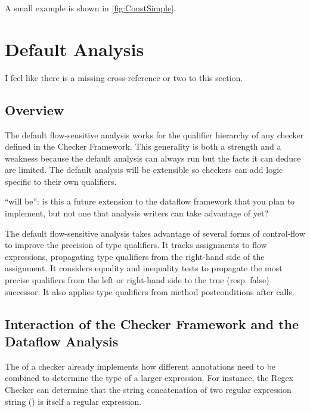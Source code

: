      A small example is shown in \autoref{fig:ConstSimple}.




\section{Default Analysis}

\begin{workinprogress}
I feel like there is a missing cross-reference or two to this section.
\end{workinprogress}

\subsection{Overview}

The default flow-sensitive analysis  works for the qualifier hierarchy of any checker defined in 
the Checker Framework.  This generality is both a strength and a weakness because the 
default analysis can
always run but the facts it can deduce are limited.  The default analysis
will be extensible so checkers can add logic specific to their own qualifiers.

\begin{workinprogress}
``will be'':  is this a future extension to the dataflow framework that you
plan to implement, but not one that analysis writers can take advantage of yet?
\end{workinprogress}

The default flow-sensitive analysis takes advantage of several forms of control-flow to improve the precision of type qualifiers.  It tracks assignments to flow expressions, propagating type qualifiers from the right-hand side of the assignment.  It considers equality and inequality tests to propagate the most precise qualifiers from the left or right-hand side to the true (resp. false) successor.  It also applies type qualifiers from method postconditions after calls.



\subsection{Interaction of the Checker Framework and the Dataflow Analysis}
\label{sec:flow-cf-interaction}

The  of a checker already implements how different annotations
need to be combined to determine the type of a larger expression.  For instance,
the Regex Checker can determine that the string concatenation of two regular expression
string () is itself a regular expression.

